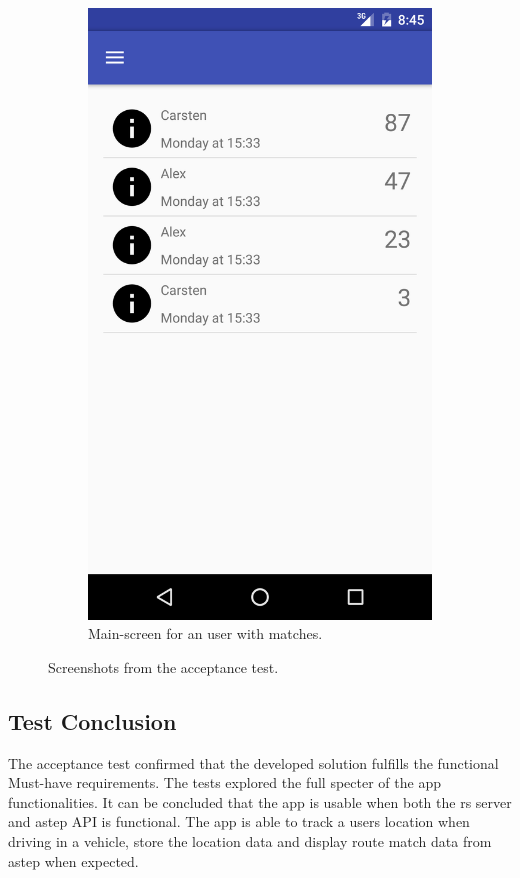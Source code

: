 \begin{figure}[ht!]
\begin{subfigure}[b]{0.24\textwidth}
        \includegraphics[width=\textwidth]{figures/s4test/testmain.png}
        \caption{Main-screen for an user with matches.}
        \label{s4tp:testmain}
\end{subfigure}
\caption{Screenshots from the acceptance test.}
\end{figure}

\subsection{Test Conclusion}
The acceptance test confirmed that the developed solution fulfills the functional Must-have requirements.
The tests explored the full specter of the app functionalities.
It can be concluded that the app is usable when both the \gls{rs} server and \gls{astep} API is functional.
The app is able to track a users location when driving in a vehicle, store the location data and display route match data from \gls{astep} when expected.

